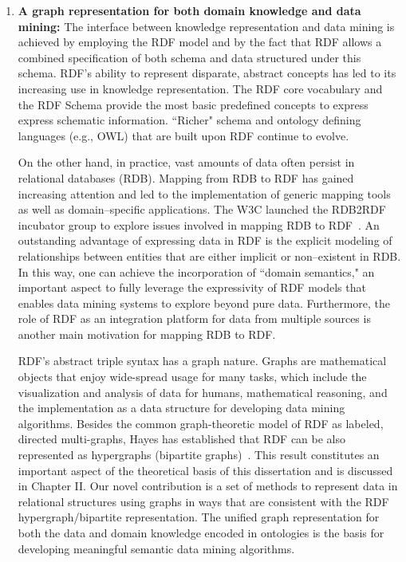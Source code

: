 \begin{enumerate}
\item \textbf{A graph representation for both domain knowledge and data mining:}
    The interface between knowledge representation and data mining is achieved by employing the RDF model and by the fact that RDF allows a combined specification of both schema and data structured under this schema. RDF's ability to represent disparate, abstract concepts has led to its increasing use in knowledge representation. The RDF core vocabulary and the RDF Schema provide the most basic predefined concepts to express express schematic information. ``Richer" schema and ontology defining languages (e.g., OWL) that are built upon RDF continue to evolve.

    On the other hand, in practice, vast amounts of data often persist in relational databases (RDB). Mapping from RDB to RDF has gained increasing attention and led to the implementation of generic mapping tools as well as domain--specific applications.  The W3C launched the RDB2RDF incubator group to explore issues involved in mapping RDB to RDF~\cite{RDB2RDF}. An outstanding advantage of expressing data in RDF is the explicit modeling of relationships between entities that are either implicit or non--existent in RDB. In this way, one can achieve the incorporation of ``domain semantics," an important aspect to fully leverage the expressivity of RDF models that enables data mining systems to explore beyond pure data. Furthermore, the role of RDF as an integration platform for data from multiple sources is another main motivation for mapping RDB to RDF.

    RDF's abstract triple syntax has a graph nature. Graphs are mathematical objects that enjoy wide-spread usage for many tasks, which include the visualization and analysis of data for humans, mathematical reasoning, and the implementation as a data structure for developing data mining algorithms. Besides the common graph-theoretic model of RDF as labeled, directed multi-graphs, Hayes has established that RDF can be also represented as hypergraphs (bipartite graphs)~\cite{GraphModelRDF}. This result constitutes an important aspect of the theoretical basis of this dissertation and is discussed in Chapter II. Our novel contribution is a set of methods to represent data in relational structures using graphs in ways that are consistent with the RDF hypergraph/bipartite representation. The unified graph representation for both the data and domain knowledge encoded in ontologies is the basis for developing meaningful semantic data mining algorithms.
    

\end{enumerate}
